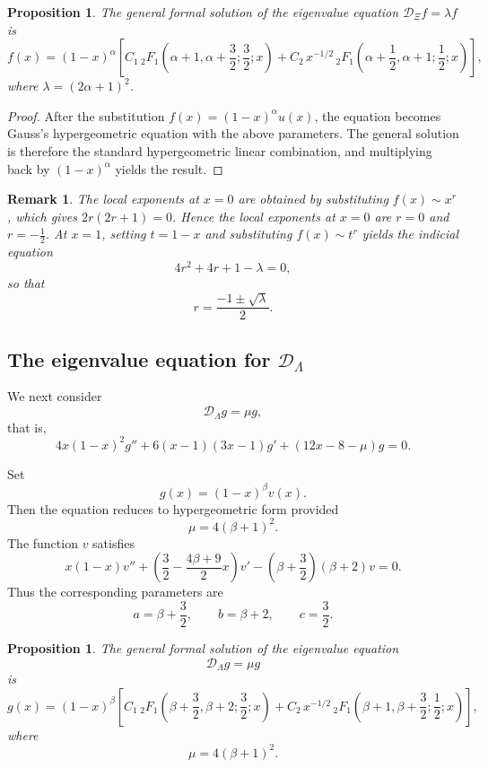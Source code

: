 \documentclass[11pt,twoside]{article}
\newtheorem{proposition}[theorem]{Proposition}
\newtheorem{remark}[theorem]{Remark}
\numberwithin{equation}{section}
\begin{document}
\begin{proposition}\label{prop:eigen-DXi}
The general formal solution of the eigenvalue equation \(\mathcal D_{\Xi}f=\lambda f\) is
\[
f(x)=(1-x)^\alpha\left[
C_1\,{}_2F_1\!\left(\alpha+1,\alpha+\frac32;\frac32;x\right)
+
C_2\,x^{-1/2}\,{}_2F_1\!\left(\alpha+\frac12,\alpha+1;\frac12;x\right)
\right],
\]
where \(\lambda=(2\alpha+1)^2\).
\end{proposition}

\begin{proof}
After the substitution \(f(x)=(1-x)^\alpha u(x)\), the equation becomes Gauss's hypergeometric equation with the above parameters. The general solution is therefore the standard hypergeometric linear combination, and multiplying back by \((1-x)^\alpha\) yields the result.
\end{proof}

\begin{remark}
The local exponents at \(x=0\) are obtained by substituting \(f(x)\sim x^r\), which gives \(2r(2r+1)=0\). Hence the local exponents at \(x=0\) are \(r=0\) and \(r=-\frac12\). At \(x=1\), setting \(t=1-x\) and substituting \(f(x)\sim t^r\) yields the indicial equation
\[
4r^2+4r+1-\lambda=0,
\]
so that
\[
r=\frac{-1\pm\sqrt{\lambda}}{2}.
\]
\end{remark}

\subsection{The eigenvalue equation for \texorpdfstring{$\mathcal D_{\Lambda}$}{DLambda}}

We next consider
\[
\mathcal D_{\Lambda}g=\mu g,
\]
that is,
\[
4x(1-x)^2g''+6(x-1)(3x-1)g'+(12x-8-\mu)g=0.
\]

Set
\[
g(x)=(1-x)^\beta v(x).
\]
Then the equation reduces to hypergeometric form provided
\[
\mu=4(\beta+1)^2.
\]
The function \(v\) satisfies
\[
x(1-x)v''+\left(\frac32-\frac{4\beta+9}{2}x\right)v'
-\left(\beta+\frac32\right)(\beta+2)v=0.
\]
Thus the corresponding parameters are
\[
a=\beta+\frac32,
\qquad
b=\beta+2,
\qquad
c=\frac32.
\]

\begin{proposition}\label{prop:eigen-DLambda}
The general formal solution of the eigenvalue equation
\[
\mathcal D_{\Lambda}g=\mu g
\]
is
\[
g(x)=(1-x)^\beta\left[
C_1\,{}_2F_1\!\left(\beta+\frac32,\beta+2;\frac32;x\right)
+
C_2\,x^{-1/2}\,{}_2F_1\!\left(\beta+1,\beta+\frac32;\frac12;x\right)
\right],
\]
where
\[
\mu=4(\beta+1)^2.
\]
\end{proposition}
\end{document}
